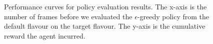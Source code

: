 \documentclass{article}
\begin{document}
\begin{figure}[H]
\\
\\
\caption{Performance curves for policy evaluation results. The x-axis is the number of frames before we evaluated the $\epsilon$-greedy policy from the default flavour on the target flavour. The y-axis is the cumulative reward the agent incurred.}
\end{figure}
\end{document}
